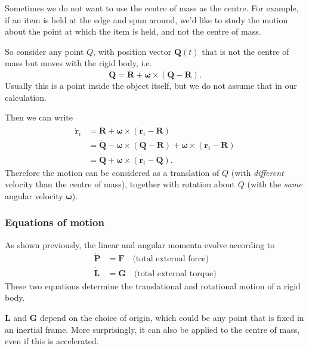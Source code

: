 Sometimes we do not want to use the centre of mass as the centre. For example, if an item is held at the edge and spun around, we'd like to study the motion about the point at which the item is held, and not the centre of mass.

So consider any point $Q$, with position vector $\mathbf{Q}(t)$ that is not the centre of mass but moves with the rigid body, i.e.
\[
  \dot{\mathbf{Q}} = \dot{\mathbf{R}} + \boldsymbol\omega\times (\mathbf{Q} - \mathbf{R}).
\]
Usually this is a point inside the object itself, but we do not assume that in our calculation.

Then we can write
\begin{align*}
  \dot{\mathbf{r}}_i &= \dot{\mathbf{R}} + \boldsymbol\omega\times (\mathbf{r}_i - \mathbf{R})\\
  &= \dot{\mathbf{Q}} - \boldsymbol\omega\times (\mathbf{Q} - \mathbf{R}) + \boldsymbol\omega \times (\mathbf{r}_i - \mathbf{R})\\
  &= \dot{\mathbf{Q}} + \boldsymbol\omega\times (\mathbf{r}_i - \mathbf{Q}).
\end{align*}
Therefore the motion can be considered as a translation of $Q$ (with \emph{different} velocity than the centre of mass), together with rotation about $Q$ (with the \emph{same} angular velocity $\boldsymbol\omega$).

\subsubsection*{Equations of motion}
As shown previously, the linear and angular momenta evolve according to
\begin{align*}
  \dot{\mathbf{P}} &= \mathbf{F}\quad \text{(total external force)}\\
  \dot{\mathbf{L}} &= \mathbf{G}\quad \text{(total external torque)}
\end{align*}
These two equations determine the translational and rotational motion of a rigid body.

$\mathbf{L}$ and $\mathbf{G}$ depend on the choice of origin, which could be any point that is fixed in an inertial frame. More surprisingly, it can also be applied to the centre of mass, even if this is accelerated.


